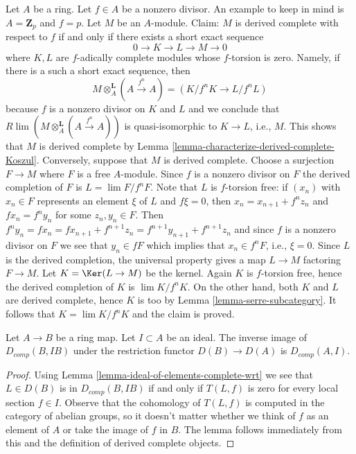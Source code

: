 \begin{example}
\label{example-derived-complete-modules}
Let $A$ be a ring. Let $f \in A$ be a nonzero divisor. An example
to keep in mind is $A = \mathbf{Z}_p$ and $f = p$. Let $M$ be
an $A$-module. Claim: $M$ is derived complete with respect to $f$
if and only if there exists a short exact sequence
$$
0 \to K \to L \to M \to 0
$$
where $K, L$ are $f$-adically complete modules whose $f$-torsion is zero.
Namely, if there is a such a short exact sequence, then
$$
M \otimes_A^\mathbf{L} (A \xrightarrow{f^n} A) = (K/f^nK \to L/f^nL)
$$
because $f$ is a nonzero divisor on $K$ and $L$
and we conclude that $R\lim (M \otimes_A^\mathbf{L} (A \xrightarrow{f^n} A))$
is quasi-isomorphic to $K \to L$, i.e., $M$. This shows that $M$ is
derived complete by Lemma \ref{lemma-characterize-derived-complete-Koszul}.
Conversely, suppose that $M$ is derived complete. Choose a surjection
$F \to M$ where $F$ is a free $A$-module. Since $f$ is a nonzero divisor
on $F$ the derived completion of $F$ is $L = \lim F/f^nF$.
Note that $L$ is $f$-torsion free: if $(x_n)$ with $x_n \in F$ represents
an element $\xi$ of $L$ and $f\xi = 0$, then $x_n = x_{n + 1} + f^nz_n$
and $fx_n = f^ny_n$ for some $z_n, y_n \in F$. Then $f^n y_n = fx_n =
fx_{n + 1} + f^{n + 1}z_n = f^{n + 1}y_{n + 1} + f^{n + 1}z_n$ and since
$f$ is a nonzero divisor on $F$ we see that $y_n \in fF$ which implies
that $x_n \in f^nF$, i.e., $\xi = 0$. Since $L$ is the derived
completion, the universal property gives a map $L \to M$ factoring
$F \to M$. Let $K = \Ker(L \to M)$ be the kernel.
Again $K$ is $f$-torsion free, hence the derived completion of
$K$ is $\lim K/f^nK$. On the other hand, both $K$ and $L$ are derived
complete, hence $K$ is too by Lemma \ref{lemma-serre-subcategory}.
It follows that $K = \lim K/f^nK$ and the claim is proved.
\end{example}

\begin{lemma}
\label{lemma-restriction-derived-complete}
Let $A \to B$ be a ring map. Let $I \subset A$ be an ideal. The inverse
image of $D_{comp}(B, IB)$ under the restriction functor $D(B) \to D(A)$ is
$D_{comp}(A, I)$.
\end{lemma}

\begin{proof}
Using Lemma \ref{lemma-ideal-of-elements-complete-wrt}
we see that $L \in D(B)$ is in $D_{comp}(B, IB)$
if and only if $T(L, f)$ is zero for every local section
$f \in I$. Observe that the cohomology of
$T(L, f)$ is computed in the category of abelian groups,
so it doesn't matter whether we think of $f$ as an element of $A$
or take the image of $f$ in $B$.
The lemma follows immediately from this and the
definition of derived complete objects.
\end{proof}

